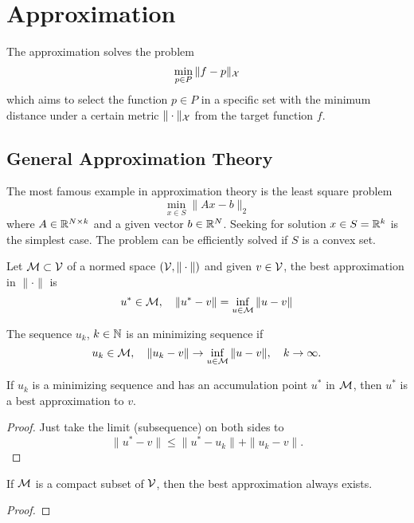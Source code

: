 \chapter{Approximation}
\label{Ch: 4-App}
The approximation solves the problem 
$$\min_{p\in P}\|f - p\|_{\mathcal X}$$
which aims to select the function $p\in P$ in a specific set with the minimum distance under a certain metric $\|\cdot\|_{\mathcal X}$ from the target function $f$. 
\section{General Approximation Theory}
\label{Sec: 4-Gen-App-The}
The most famous example in approximation theory is the least square problem 
$$\min_{x\in S} \|Ax - b\|_2$$
where $A\in\mathbb R^{N\times k}$ and a given vector $b\in \mathbb R^N$. Seeking for solution $x\in S = \mathbb R^k$ is the simplest case. The problem can be efficiently solved if $S$ is a convex set. 
\begin{definition}
    Let $\mathcal M\subset \mathcal V$ of a normed space $(\mathcal V, \|\cdot\|)$ and given $v\in\mathcal V$, the best approximation in $\|\cdot\|$ is 
    $$u^{\ast}\in\mathcal M,\quad \|u^{\ast} - v\| = \inf_{u\in\mathcal M} \|u - v\|$$
\end{definition}
\begin{definition}
    The sequence $u_k$, $k\in\mathbb N$ is an minimizing sequence if 
    \begin{equation}
        u_k \in\mathcal M,\quad \|u_k - v\|\to \inf_{u\in\mathcal M}\|u - v\|,\quad k\to\infty.
    \end{equation}
\end{definition}
\begin{theorem}
\label{Thm: 4-Exi-Bes-App}
If $u_k$ is a minimizing sequence and has an accumulation point $u^{\ast}$ in $\mathcal M$, then  $u^{\ast}$ is a best approximation to $v$.
\end{theorem}
\begin{proof}
    Just take the limit (subsequence) on both sides to 
    \begin{equation}
        \|u^{\ast} - v\| \le \|u^{\ast} - u_k\| + \|u_k - v\|.
    \end{equation}
\end{proof}
\begin{theorem}
\label{Thm: 4-Com-Exi}
    If $\mathcal M$ is a compact subset of $\mathcal V$, then the best approximation always exists.
\end{theorem}
\begin{proof}
    
\end{proof}
